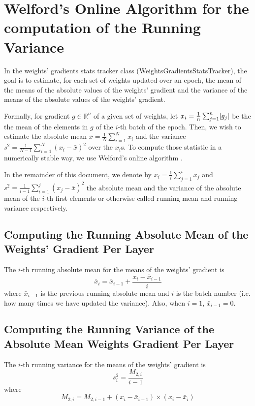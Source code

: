 \documentclass[10pt, a4paper]{article}
\DeclarePairedDelimiter\abs{\lvert}{\rvert}%
\begin{document}
	\section*{Welford's Online Algorithm for the computation of the Running Variance}
	In the weights' gradients stats tracker class (WeightsGradientsStatsTracker), the goal is to estimate, for each set of weights updated over an epoch, the mean of the means of the absolute values of the weights' gradient and the variance of the means of the absolute values of the weights' gradient.
	
	Formally, for gradient $g \in \mathds{R}^n$ of a given set of weights, let $x_i = \frac{1}{n} \sum_{j=1}^n \abs*{g_j}$ be the the mean of the elements in $g$ of the $i$-th batch of the epoch. Then, we wish to estimate the absolute mean $\bar{x} = \frac{1}{N} \sum_{i=1}^N x_i$ and the variance $s^2 = \frac{1}{N-1} \sum_{i=1}^N (x_i - \bar{x})^2$ over the $x_i$s. To compute those statistic in a numerically stable way, we use Welford's online algorithm \cite{doi:10.1080/00401706.1962.10490022}.
	
	In the remainder of this document, we denote by $\bar{x}_i = \frac{1}{i} \sum_{j=1}^i x_j$ and $s^2 = \frac{1}{i-1} \sum_{i=1}^j (x_j - \bar{x})^2$ the absolute mean and the variance of the absolute mean of the $i$-th first elements or otherwise called running mean and running variance respectively. 
	
	
	\subsection*{Computing the Running Absolute Mean of the Weights' Gradient Per Layer}
	The $i$-th running absolute mean for the means of the weights' gradient is
	\begin{equation*}
	\bar{x}_{i} = \bar{x}_{i - 1} + \frac{x_{i} - \bar{x}_{i - 1} }{i}
	\end{equation*}
	where $\bar{x}_{i - 1}$ is the previous running absolute mean and $i$ is the batch number (i.e. how many times we have updated the variance). Also, when $i = 1$, $\bar{x}_{i - 1} = 0$.
	
	\subsection*{Computing the Running Variance of the Absolute Mean Weights Gradient Per Layer}
	The $i$-th running variance for the means of the weights' gradient is
	\begin{equation*}
	s^2_{i} = \frac{M_{2, i}}{i - 1}
	\end{equation*}
	where
	\begin{equation*}
	M_{2, i} = M_{2, i- 1} + (x_{i} - \bar{x}_{i-1}) \times (x_{i} - \bar{x}_{i})
	\end{equation*}
	
\end{document}
